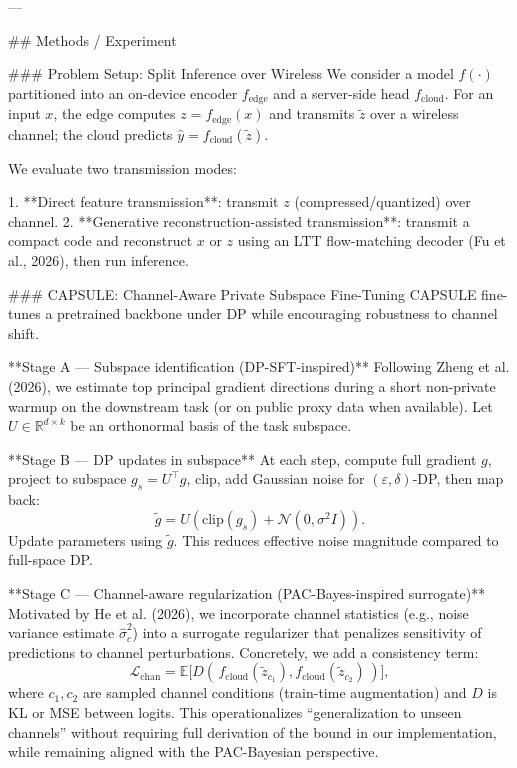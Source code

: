 ---

## Methods / Experiment  

### Problem Setup: Split Inference over Wireless  
We consider a model \(f(\cdot)\) partitioned into an on-device encoder \(f_{\text{edge}}\) and a server-side head \(f_{\text{cloud}}\). For an input \(x\), the edge computes \(z=f_{\text{edge}}(x)\) and transmits \(\tilde{z}\) over a wireless channel; the cloud predicts \(\hat{y}=f_{\text{cloud}}(\tilde{z})\).

We evaluate two transmission modes:

1. **Direct feature transmission**: transmit \(z\) (compressed/quantized) over channel.  
2. **Generative reconstruction-assisted transmission**: transmit a compact code and reconstruct \(x\) or \(z\) using an LTT flow-matching decoder (Fu et al., 2026), then run inference.

### CAPSULE: Channel-Aware Private Subspace Fine-Tuning  
CAPSULE fine-tunes a pretrained backbone under DP while encouraging robustness to channel shift.

**Stage A — Subspace identification (DP-SFT-inspired)**  
Following Zheng et al. (2026), we estimate top principal gradient directions during a short non-private warmup on the downstream task (or on public proxy data when available). Let \(U\in\mathbb{R}^{d\times k}\) be an orthonormal basis of the task subspace.

**Stage B — DP updates in subspace**  
At each step, compute full gradient \(g\), project to subspace \(g_s = U^\top g\), clip, add Gaussian noise for \((\varepsilon,\delta)\)-DP, then map back:  
\[
\tilde{g} = U(\text{clip}(g_s)+\mathcal{N}(0,\sigma^2 I)).
\]
Update parameters using \(\tilde{g}\). This reduces effective noise magnitude compared to full-space DP.

**Stage C — Channel-aware regularization (PAC-Bayes-inspired surrogate)**  
Motivated by He et al. (2026), we incorporate channel statistics (e.g., noise variance estimate \(\hat{\sigma}_c^2\)) into a surrogate regularizer that penalizes sensitivity of predictions to channel perturbations. Concretely, we add a consistency term:
\[
\mathcal{L}_{\text{chan}}=\mathbb{E}\big[ D(\, f_{\text{cloud}}(\tilde{z}_{c_1}), f_{\text{cloud}}(\tilde{z}_{c_2}) \,)\big],
\]
where \(c_1,c_2\) are sampled channel conditions (train-time augmentation) and \(D\) is KL or MSE between logits. This operationalizes “generalization to unseen channels” without requiring full derivation of the bound in our implementation, while remaining aligned with the PAC-Bayesian perspective.

